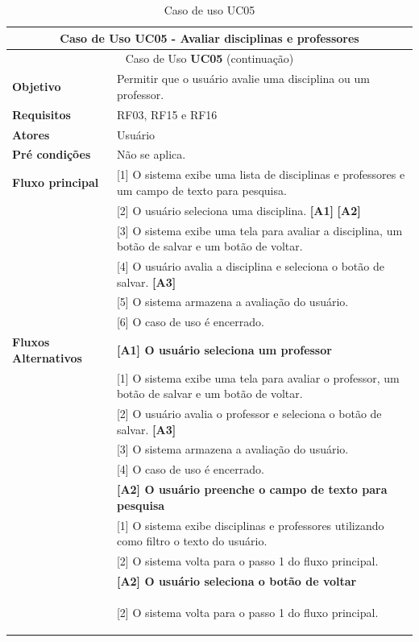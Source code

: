 \begin{longtable}{ | m{} | m{} | }
    \hline\hline
    \multicolumn{2}{|c|}{Caso de Uso \textbf{UC05} - Avaliar disciplinas e professores}\tabularnewline\hline\hline\endfirsthead
    \hline\hline
    \multicolumn{2}{|c|}{Caso de Uso \textbf{UC05} (continuação)}\tabularnewline\hline\hline\endhead
    \hline\endfoot
    \hline\caption{Caso de uso UC05}\endlastfoot

    \textbf{Objetivo} & Permitir que o usuário avalie uma disciplina ou um professor.\tabularnewline\hline
    \textbf{Requisitos} & RF03, RF15 e RF16\tabularnewline\hline
    \textbf{Atores} & Usuário\tabularnewline\hline
    \textbf{Pré condições} & Não se aplica.\tabularnewline\hline

    \multirow{1}{*}{\textbf{Fluxo principal}} & [1] O sistema exibe uma lista de disciplinas e professores e um campo de texto para pesquisa.\tabularnewline\cline{2-2}
    & [2] O usuário seleciona uma disciplina. \textbf{[A1]} \textbf{[A2]}\tabularnewline\cline{2-2}
    & [3] O sistema exibe uma tela para avaliar a disciplina, um botão de salvar e um botão de voltar.\tabularnewline\cline{2-2}
    & [4] O usuário avalia a disciplina e seleciona o botão de salvar. \textbf{[A3]}\tabularnewline\cline{2-2}
    & [5] O sistema armazena a avaliação do usuário.\tabularnewline\cline{2-2}
    & [6] O caso de uso é encerrado.\tabularnewline\hline

    \multirow{1}{*}{\textbf{Fluxos Alternativos}} & \textbf{[A1] O usuário seleciona um professor}\tabularnewline\cline{2-2}
    & [1] O sistema exibe uma tela para avaliar o professor, um botão de salvar e um botão de voltar.\tabularnewline\cline{2-2}
    & [2] O usuário avalia o professor e seleciona o botão de salvar. \textbf{[A3]}\tabularnewline\cline{2-2} 
    & [3] O sistema armazena a avaliação do usuário.\tabularnewline\cline{2-2}
    & [4] O caso de uso é encerrado.\tabularnewline\cline{2-2}

    & \textbf{[A2] O usuário preenche o campo de texto para pesquisa}\tabularnewline\cline{2-2}
    & [1] O sistema exibe disciplinas e professores utilizando como filtro o texto do usuário.\tabularnewline\cline{2-2}
    & [2] O sistema volta para o passo 1 do fluxo principal.\tabularnewline\cline{2-2}

    & \textbf{[A2] O usuário seleciona o botão de voltar}\tabularnewline\cline{2-2}
    & [2] O sistema volta para o passo 1 do fluxo principal. %

    \label{tab:uc05}
\end{longtable}
